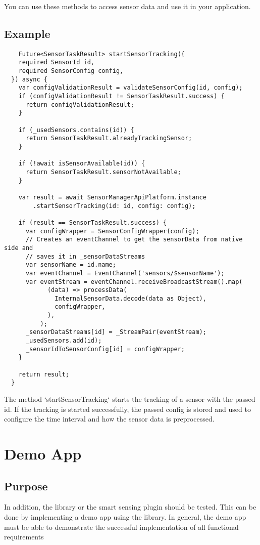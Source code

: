 \documentclass[12pt]{article}
\newcounter{fr}
\begin{document}
    You can use these methods to access sensor data and use it in your application.

\subsection{Example}
\begin{verbatim}
    Future<SensorTaskResult> startSensorTracking({
    required SensorId id,
    required SensorConfig config,
  }) async {
    var configValidationResult = validateSensorConfig(id, config);
    if (configValidationResult != SensorTaskResult.success) {
      return configValidationResult;
    }

    if (_usedSensors.contains(id)) {
      return SensorTaskResult.alreadyTrackingSensor;
    }

    if (!await isSensorAvailable(id)) {
      return SensorTaskResult.sensorNotAvailable;
    }

    var result = await SensorManagerApiPlatform.instance
        .startSensorTracking(id: id, config: config);

    if (result == SensorTaskResult.success) {
      var configWrapper = SensorConfigWrapper(config);
      // Creates an eventChannel to get the sensorData from native side and
      // saves it in _sensorDataStreams
      var sensorName = id.name;
      var eventChannel = EventChannel('sensors/$sensorName');
      var eventStream = eventChannel.receiveBroadcastStream().map(
            (data) => processData(
              InternalSensorData.decode(data as Object),
              configWrapper,
            ),
          );
      _sensorDataStreams[id] = _StreamPair(eventStream);
      _usedSensors.add(id);
      _sensorIdToSensorConfig[id] = configWrapper;
    }

    return result;
  }
\end{verbatim}
    The method `startSensorTracking` starts the tracking of a sensor with the passed id. If the tracking is started successfully, the passed config is stored and used to configure the time interval and how the sensor data is preprocessed.

\section{Demo App}

\subsection{Purpose}
    In addition, the library or the smart sensing plugin should be tested. This can be done by implementing a demo app using the library. In general, the demo app must be able to demonstrate the successful implementation of all functional requirements
\end{document}
